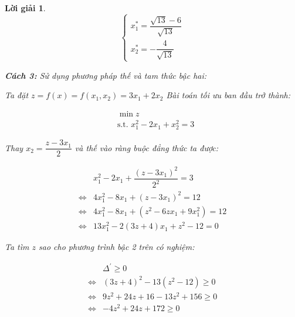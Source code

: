 \documentclass[14pt, a4paper]{article}
\theoremstyle{sltheorem}
\theoremstyle{soltheorem}
\newtheorem*{loigiai}{Lời giải}
\begin{document}
\begin{loigiai}
        \begin{equation*}
            \begin{cases}
            x_1^* = \dfrac{\sqrt{13} - 6}{\sqrt{13}} \\
            x_2^* = -\dfrac{4}{\sqrt{13}}
            \end{cases}
        \end{equation*}

        \textbf{Cách 3:} Sử dụng phương pháp thế và tam thức bậc hai:

        Ta đặt $z = f(x) = f(x_1, x_2) = 3 x_1 + 2 x_2$
        Bài toán tối ưu ban đầu trở thành:

        \begin{equation*}
            \begin{aligned}
                &\min z \\ &\text{s.t. }x_1^2 - 2 x_1 + x_2^2 = 3
            \end{aligned}
        \end{equation*}

        Thay $x_2 = \dfrac{z - 3 x_1}{2}$ và thế vào ràng buộc đẳng thức ta được:

        \begin{equation*}
            \begin{aligned}
                &x_1^2 - 2x_1 + \dfrac{(z - 3 x_1)^2}{2^2}=3 \\
                \Leftrightarrow & 4 x_1^2 - 8 x_1 + (z - 3 x_1)^2 = 12 \\
                \Leftrightarrow & 4 x_1^2 - 8 x_1 + (z^2 - 6z x_1 + 9 x_1^2) = 12 \\
                \Leftrightarrow & 13 x_1^2 - 2(3z + 4)x_1 + z^2 - 12 = 0
            \end{aligned}
        \end{equation*}

        Ta tìm $z$ sao cho phương trình bậc 2 trên có nghiệm:

        \begin{equation*}
            \begin{aligned}
            &\Delta^{\prime} \geq 0 \\
            \Leftrightarrow & (3z + 4)^2 - 13(z^2 - 12) \geq 0 \\
            \Leftrightarrow & 9z^2 + 24z + 16 - 13 z^2 + 156 \geq 0 \\
            \Leftrightarrow & -4 z^2 + 24z + 172 \geq 0
            \end{aligned}
        \end{equation*}


\end{loigiai}
\end{document}
